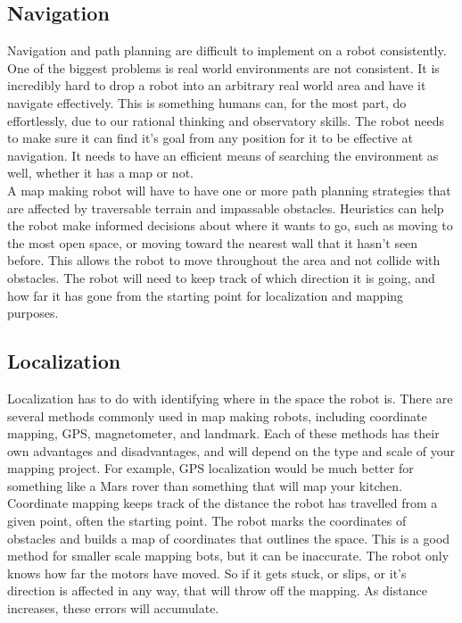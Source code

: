 \documentclass[12pt]{article}
\begin{document}

	\subsection{Navigation}
Navigation and path planning are difficult to implement on a robot consistently. One of the biggest problems is real world environments are not consistent. It is incredibly hard to drop a robot into an arbitrary real world area and have it navigate effectively. This is something humans can, for the most part, do effortlessly, due to our rational thinking and observatory skills. The robot needs to make sure it can find it’s goal from any position for it to be effective at navigation. It needs to have an efficient means of searching the environment as well, whether it has a map or not.\\

A map making robot will have to have one or more path planning strategies that are affected by traversable terrain and impassable obstacles. Heuristics can help the robot make informed decisions about where it wants to go, such as moving to the most open space, or moving toward the nearest wall that it hasn’t seen before. This allows the robot to move throughout the area and not collide with obstacles. The robot will need to keep track of which direction it is going, and how far it has gone from the starting point for localization and mapping purposes.

	\subsection{Localization}
Localization has to do with identifying where in the space the robot is. There are several methods commonly used in map making robots, including coordinate mapping, GPS, magnetometer, and landmark. Each of these methods has their own advantages and disadvantages, and will depend on the type and scale of your mapping project. For example, GPS localization would be much better for something like a Mars rover than something that will map your kitchen.\\

Coordinate mapping keeps track of the distance the robot has travelled from a given point, often the starting point. The robot marks the coordinates of obstacles and builds a map of coordinates that outlines the space. This is a good method for smaller scale mapping bots, but it can be inaccurate. The robot only knows how far the motors have moved. So if it gets stuck, or slips, or it’s direction is affected in any way, that will throw off the mapping. As distance increases, these errors will accumulate. \\
\end{document}
